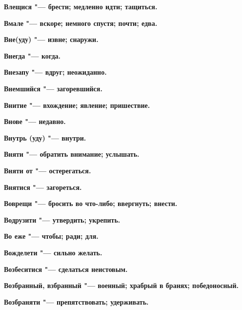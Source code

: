 \begin{multicols}{2}
\bfseries Влещися\normalfont{} "--- брести; медленно идти; тащиться. 




\bfseries Вмале\normalfont{} "--- вскоре; немного спустя; почти; едва. 




\bfseries Вне(уду)\normalfont{} "--- извне; снаружи. 




\bfseries Внегда\normalfont{} "--- когда. 




\bfseries Внезапу\normalfont{} "--- вдруг; неожиданно. 




\bfseries Внемшийся\normalfont{} "--- загоревшийся. 




\bfseries Внитие\normalfont{} "--- вхождение; явление; пришествие. 




\bfseries Внове\normalfont{} "--- недавно. 




\bfseries Внутрь (уду)\normalfont{} "--- внутри. 




\bfseries Вняти\normalfont{} "--- обратить внимание; услышать. 




\bfseries Вняти от\normalfont{} "--- остерегаться. 




\bfseries Внятися\normalfont{} "--- загореться. 




\bfseries Воврещи\normalfont{} "--- бросить во что-либо; ввергнуть; внести. 




\bfseries Водрузити\normalfont{} "--- утвердить; укрепить. 




\bfseries Во еже\normalfont{} "--- чтобы; ради; для. 




\bfseries Вожделети\normalfont{} "--- сильно желать. 




\bfseries Возбеситися\normalfont{} "--- сделаться неистовым. 




\bfseries Возбранный, взбранный\normalfont{} "--- военный; храбрый в бранях; победоносный. 




\bfseries Возбраняти\normalfont{} "--- препятствовать; удерживать. 





\end{multicols}
